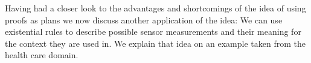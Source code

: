 Having had a closer look to the advantages and shortcomings of the idea of using proofs as plans we now discuss another application of the idea:
We can use existential rules to describe possible sensor measurements and their meaning for the context they are used in. We 
explain that idea on an example taken from the health care domain.


% 

